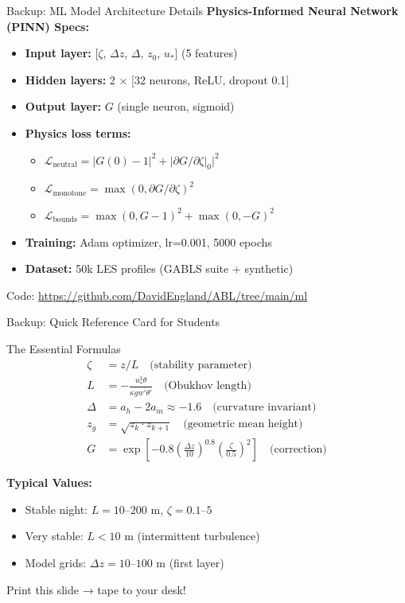 \documentclass[10pt,aspectratio=169]{beamer}
\begin{document}
\begin{frame}{Backup: ML Model Architecture Details}
  \textbf{Physics-Informed Neural Network (PINN) Specs:}
  
  \begin{itemize}
    \item \textbf{Input layer:} [$\zeta$, $\Delta z$, $\Delta$, $z_0$, $u_*$] (5 features)
    \item \textbf{Hidden layers:} 2 × [32 neurons, ReLU, dropout 0.1]
    \item \textbf{Output layer:} $G$ (single neuron, sigmoid)
    \item \textbf{Physics loss terms:}
    \begin{itemize}
      \item $\mathcal{L}_{\text{neutral}} = |G(0) - 1|^2 + |\partial G/\partial\zeta|_0|^2$
      \item $\mathcal{L}_{\text{monotone}} = \max(0, \partial G/\partial\zeta)^2$
      \item $\mathcal{L}_{\text{bounds}} = \max(0, G-1)^2 + \max(0, -G)^2$
    \end{itemize}
    \item \textbf{Training:} Adam optimizer, lr=0.001, 5000 epochs
    \item \textbf{Dataset:} 50k LES profiles (GABLS suite + synthetic)
  \end{itemize}
  
  Code: \url{https://github.com/DavidEngland/ABL/tree/main/ml}
\end{frame}

\begin{frame}{Backup: Quick Reference Card for Students}
  \begin{block}{The Essential Formulas}
    \begin{align*}
      \zeta &= z/L \quad \text{(stability parameter)} \\
      L &= -\frac{u_*^3 \theta}{\kappa g \overline{w'\theta'}} \quad \text{(Obukhov length)} \\
      \Delta &= a_h - 2a_m \approx -1.6 \quad \text{(curvature invariant)} \\
      z_g &= \sqrt{z_k \cdot z_{k+1}} \quad \text{(geometric mean height)} \\
      G &= \exp\!\left[-0.8\left(\frac{\Delta z}{10}\right)^{0.8}\left(\frac{\zeta}{0.5}\right)^2\right] \quad \text{(correction)}
    \end{align*}
  \end{block}
  
  \vspace{0.3cm}
  \textbf{Typical Values:}
  \begin{itemize}
    \item Stable night: $L = 10$--$200$ m, $\zeta = 0.1$--$5$
    \item Very stable: $L < 10$ m (intermittent turbulence)
    \item Model grids: $\Delta z = 10$--$100$ m (first layer)
  \end{itemize}
  
  \vspace{0.3cm}
  Print this slide → tape to your desk!
\end{frame}
\end{document}
